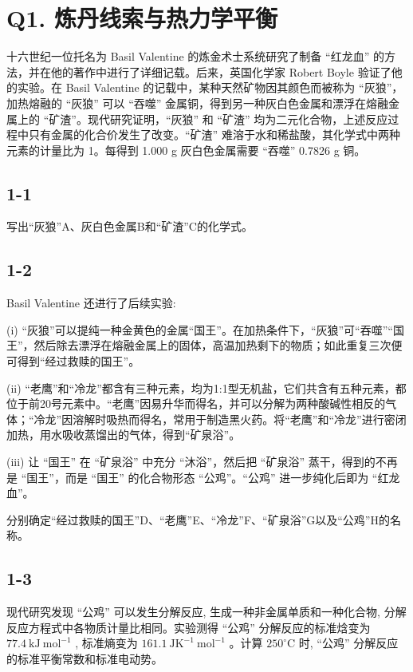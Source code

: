\section*{Q1. 炼丹线索与热力学平衡}
十六世纪一位托名为 Basil Valentine 的炼金术士系统研究了制备 “红龙血” 的方法，并在他的著作中进行了详细记载。后来，英国化学家 Robert Boyle 验证了他的实验。在 Basil Valentine 的记载中，某种天然矿物因其颜色而被称为 “灰狼”，加热熔融的 “灰狼” 可以 “吞噬” 金属铜，得到另一种灰白色金属和漂浮在熔融金属上的 “矿渣”。现代研究证明，“灰狼” 和 “矿渣” 均为二元化合物，上述反应过程中只有金属的化合价发生了改变。“矿渣” 难溶于水和稀盐酸，其化学式中两种元素的计量比为 1。每得到 1.000 g 灰白色金属需要 “吞噬” 0.7826 g 铜。

\subsection*{1-1}
写出“灰狼”A、灰白色金属B和“矿渣”C的化学式。

\subsection*{1-2}
Basil Valentine 还进行了后续实验:

(i) “灰狼”可以提纯一种金黄色的金属“国王”。在加热条件下，“灰狼”可“吞噬”“国王”，然后除去漂浮在熔融金属上的固体，高温加热剩下的物质；如此重复三次便可得到“经过救赎的国王”。

(ii) “老鹰”和“冷龙”都含有三种元素，均为1:1型无机盐，它们共含有五种元素，都位于前20号元素中。“老鹰”因易升华而得名，并可以分解为两种酸碱性相反的气体；“冷龙”因溶解时吸热而得名，常用于制造黑火药。将“老鹰”和“冷龙”进行密闭加热，用水吸收蒸馏出的气体，得到“矿泉浴”。

(iii) 让 “国王” 在 “矿泉浴” 中充分 “沐浴”，然后把 “矿泉浴” 蒸干，得到的不再是 “国王”，而是 “国王” 的化合物形态 “公鸡”。“公鸡” 进一步纯化后即为 “红龙血”。

分别确定“经过救赎的国王”D、“老鹰”E、“冷龙”F、“矿泉浴”G以及“公鸡”H的名称。

\subsection*{1-3}
现代研究发现 “公鸡” 可以发生分解反应, 生成一种非金属单质和一种化合物, 分解反应方程式中各物质计量比相同。实验测得 “公鸡” 分解反应的标准焓变为 $77.4 \mathrm{~kJ} \mathrm{~mol}^{- 1}$ , 标准熵变为 $161.1 \mathrm{~J} \mathrm{K}^{- 1} \mathrm{~mol}^{- 1}$ 。计算 $250^{\circ} \mathrm{C}$ 时, “公鸡” 分解反应的标准平衡常数和标准电动势。
